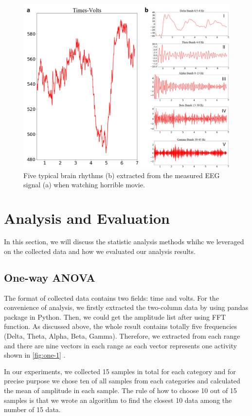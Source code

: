 \documentclass[letterpaper,twocolumn,10pt]{article}
\begin{document}
\begin{figure}[h!]
  \centering
  \includegraphics[width=0.8\linewidth]{fig/waves}
  \caption{Five typical brain rhythms (b) extracted from the measured EEG signal (a) when watching horrible movie.}
  \label{fig:waves}
\end{figure}


\section{Analysis and Evaluation}
In this section, we will discuss the statistic analysis methods whihc we leveraged on the collected data and how we evaluated our analysis results.

\subsection{One-way ANOVA}

The format of collected data contains two fields: time and volts. For the convenience of analysis, we firstly extracted the two-column data by using pandas package in Python. Then, we could get the amplitude list after using FFT function. As discussed above, the whole result contains totally five frequencies (Delta, Theta, Alpha, Beta, Gamma). Therefore, we extracted from each range and there are nine vectors in each range as each vector represents one activity shown in \ref{fig:one-1} .

In our experiments, we collected 15 samples in total for each category and for precise purpose we chose ten of all samples from each categories and calculated the mean of amplitude in each sample. The rule of how to choose 10 out of 15 samples is that we wrote an algorithm to find the closest 10 data among the number of 15 data.
\end{document}
